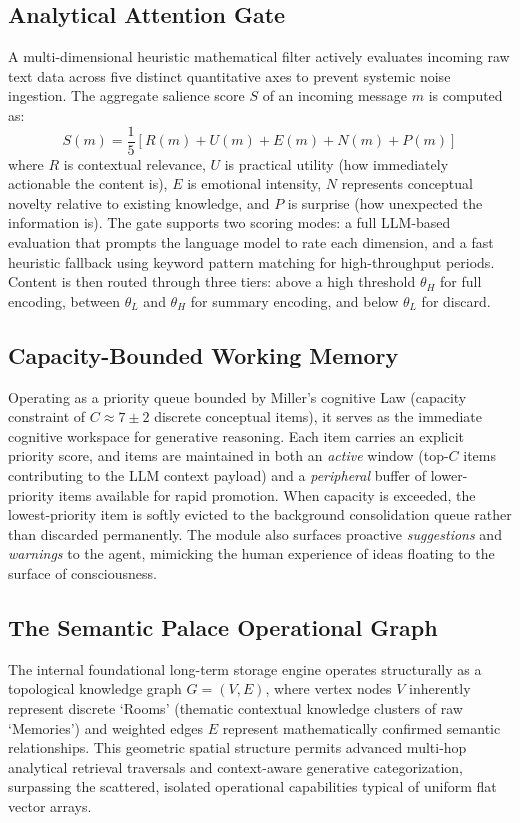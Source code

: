\documentclass[conference]{IEEEtran}
\begin{document}
\subsection{Analytical Attention Gate}
A multi-dimensional heuristic mathematical filter actively evaluates incoming raw text data across five distinct quantitative axes to prevent systemic noise ingestion. The aggregate salience score $S$ of an incoming message $m$ is computed as:
\begin{equation}
S(m) = \frac{1}{5}\left[R(m) + U(m) + E(m) + N(m) + P(m)\right]
\end{equation}
where $R$ is contextual relevance, $U$ is practical utility (how immediately actionable the content is), $E$ is emotional intensity, $N$ represents conceptual novelty relative to existing knowledge, and $P$ is surprise (how unexpected the information is). The gate supports two scoring modes: a full LLM-based evaluation that prompts the language model to rate each dimension, and a fast heuristic fallback using keyword pattern matching for high-throughput periods. Content is then routed through three tiers: above a high threshold $\theta_H$ for full encoding, between $\theta_L$ and $\theta_H$ for summary encoding, and below $\theta_L$ for discard.

\subsection{Capacity-Bounded Working Memory}
Operating as a priority queue bounded by Miller's cognitive Law \cite{miller1956magical} (capacity constraint of $C \approx 7 \pm 2$ discrete conceptual items), it serves as the immediate cognitive workspace for generative reasoning. Each item carries an explicit priority score, and items are maintained in both an \textit{active} window (top-$C$ items contributing to the LLM context payload) and a \textit{peripheral} buffer of lower-priority items available for rapid promotion. When capacity is exceeded, the lowest-priority item is softly evicted to the background consolidation queue rather than discarded permanently. The module also surfaces proactive \textit{suggestions} and \textit{warnings} to the agent, mimicking the human experience of ideas floating to the surface of consciousness.

\subsection{The Semantic Palace Operational Graph}
The internal foundational long-term storage engine operates structurally as a topological knowledge graph $G = (V, E)$, where vertex nodes $V$ inherently represent discrete `Rooms' (thematic contextual knowledge clusters of raw `Memories') and weighted edges $E$ represent mathematically confirmed semantic relationships. This geometric spatial structure permits advanced multi-hop analytical retrieval traversals and context-aware generative categorization, surpassing the scattered, isolated operational capabilities typical of uniform flat vector arrays.
\end{document}

